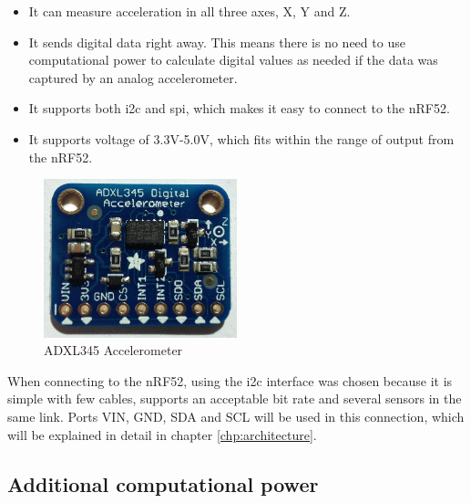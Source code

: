 \begin{itemize}
  \item It can measure acceleration in all three axes, X, Y and Z.
  \item It sends digital data right away. This means there is no need to use computational power to calculate digital values as needed if the data was captured by an analog accelerometer. 
  \item It supports both \gls{i2c} and \gls{spi}, which makes it easy to connect to the nRF52. 
  \item It supports voltage of 3.3V-5.0V, which fits within the range of output from the nRF52.  
\end{itemize}




\begin{figure}[ht]
    \centering
    \includegraphics[width=0.5\textwidth]{adxl345imagge}    
    \caption{ADXL345 Accelerometer}
    \label{fig:adxl345}
\end{figure}

\noindent When connecting to the \gls{nRF52}, using the \gls{i2c} interface was chosen because it is simple with few cables, supports an acceptable bit rate and several sensors in the same link. Ports VIN, GND, SDA and SCL will be used in this connection, which will be explained in detail in chapter \ref{chp:architecture}. 

\subsection{Additional computational power}

